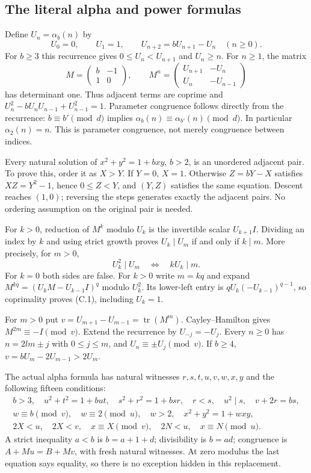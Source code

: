 \subsection{The literal alpha and power formulas}
Define $U_n=\alpha_b(n)$ by
\[
 U_0=0,\qquad U_1=1,\qquad U_{n+2}=bU_{n+1}-U_n\quad(n\ge0).
\]
For $b\ge3$ this recurrence gives
$0\le U_n<U_{n+1}$ and $U_n\ge n$. For $n\ge1$, the matrix
\[
 M=\begin{pmatrix}b&-1\\1&0\end{pmatrix},\qquad
 M^n=\begin{pmatrix}U_{n+1}&-U_n\\U_n&-U_{n-1}\end{pmatrix}
\]
has determinant one. Thus adjacent terms are coprime and
$U_n^2-bU_nU_{n-1}+U_{n-1}^2=1$.
Parameter congruence follows directly from the recurrence:
$b\equiv b'\pmod d$ implies
$\alpha_b(n)\equiv\alpha_{b'}(n)\pmod d$.
In particular $\alpha_2(n)=n$. This is parameter congruence,
not merely congruence between indices.

Every natural solution of $x^2+y^2=1+bxy$, $b>2$, is an unordered
adjacent pair. To prove this, order it as $X>Y$. If $Y=0$, $X=1$.
Otherwise $Z=bY-X$ satisfies $XZ=Y^2-1$, hence $0\le Z<Y$,
and $(Y,Z)$ satisfies the same equation. Descent reaches $(1,0)$;
reversing the steps generates exactly the adjacent pairs.
No ordering assumption on the original pair is needed.

For $k>0$, reduction of $M^k$ modulo $U_k$ is the invertible scalar
$U_{k+1}I$. Dividing an index by $k$ and using strict growth proves
$U_k\mid U_m$ if and only if $k\mid m$. More precisely, for $m>0$,
\[
                    U_k^2\mid U_m\quad\Longleftrightarrow\quad
                         kU_k\mid m.                           \tag{C.1}
\]
For $k=0$ both sides are false. For $k>0$ write $m=kq$ and expand
$M^{kq}=(U_kM-U_{k-1}I)^q$ modulo $U_k^2$. Its lower-left entry is
$qU_k(-U_{k-1})^{q-1}$, so coprimality proves (C.1), including $U_k=1$.

For $m>0$ put $v=U_{m+1}-U_{m-1}=\operatorname{tr}(M^m)$.
Cayley--Hamilton gives $M^{2m}\equiv-I\pmod v$.
Extend the recurrence by $U_{-j}=-U_j$. Every $n\ge0$ has
$n=2lm\pm j$ with $0\le j\le m$, and
$U_n\equiv\pm U_j\pmod v$. If $b\ge4$,
$v=bU_m-2U_{m-1}>2U_m$.

The actual alpha formula has natural witnesses $r,s,t,u,v,w,x,y$
and the following fifteen conditions:
\[
\begin{gathered}
 b>3,\quad u^2+t^2=1+but,\quad s^2+r^2=1+bsr,\quad r<s,\quad
 u^2\mid s,\quad v+2r=bs,\\
 w\equiv b\pmod v,\quad w\equiv2\pmod u,\quad w>2,\quad
 x^2+y^2=1+wxy,\\
 2X<u,\quad2X<v,\quad x\equiv X\pmod v,\quad
 2N<u,\quad x\equiv N\pmod u.
\end{gathered}                                                   \tag{C.2}
\]
A strict inequality $a<b$ is $b=a+1+d$; divisibility is $b=ad$;
congruence is $A+Mu=B+Mv$, with fresh natural witnesses.
At zero modulus the last equation says equality, so there is no
exception hidden in this replacement.

